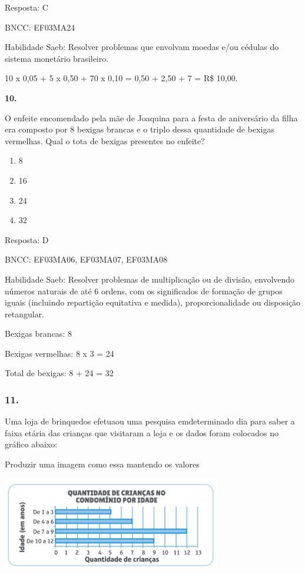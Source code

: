 Resposta: C

BNCC: EF03MA24

Habilidade Saeb: Resolver problemas que envolvam moedas e/ou cédulas do
sistema monetário brasileiro.

10 x 0,05 + 5 x 0,50 + 70 x 0,10 = 0,50 + 2,50 + 7 = R\$ 10,00.

\textbf{10.}

O enfeite encomendado pela mãe de Joaquina para a festa de aniversário
da filha era composto por 8 bexigas brancas e o triplo dessa quantidade
de bexigas vermelhas. Qual o tota de bexigas presentes no enfeite?

\begin{enumerate}
\def\labelenumi{\alph{enumi})}
\item
  8
\item
  16
\item
  24
\item
  32
\end{enumerate}

Resposta: D

BNCC: EF03MA06, EF03MA07, EF03MA08

Habilidade Saeb: Resolver problemas de multiplicação ou de divisão,
envolvendo números naturais de até 6 ordens, com os significados de
formação de grupos iguais (incluindo repartição equitativa e medida),
proporcionalidade ou disposição retangular.

Bexigas brancas: 8

Bexigas vermelhas: 8 x 3 = 24

Total de bexigas: 8 + 24 = 32

\subsubsection{11. }\label{section-177}

Uma loja de brinquedos efetuaou uma pesquisa emdeterminado dia para
saber a faixa etária das crianças que visitaram a loja e os dados foram
colocados no gráfico abaixo:

Produzir uma imagem como essa mantendo os valores

\includegraphics[width=3.77564in,height=1.60972in]{media/image136.png}

